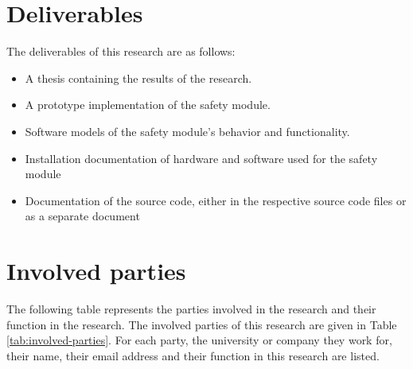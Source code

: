 \documentclass[12pt]{scrreprt}
\begin{document}
\section{Deliverables}
\label{Deliverables}
The deliverables of this research are as follows:

\begin{itemize}
    \item A thesis containing the results of the research.
    \item A prototype implementation of the safety module.
    \item Software models of the safety module's behavior and functionality.
    \item Installation documentation of hardware and software used for the safety module
    \item Documentation of the source code, either in the respective source code files or as a separate document
\end{itemize}

\section{Involved parties}
\label{Parties involved and communication scheme}
The following table represents the parties involved in the research and their function in the research.
The involved parties of this research are given in Table \ref{tab:involved-parties}. For each party, the university or company they work for, their name, their email address and their function in this research are listed.
\end{document}
